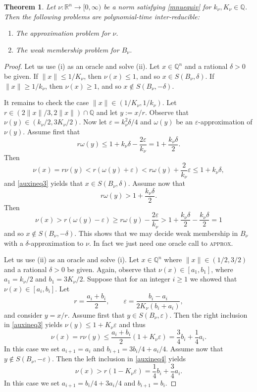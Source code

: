 \documentclass[11pt,reqno]{amsart}
\newtheorem{theorem}{Theorem}[section]
\theoremstyle{definition}
\theoremstyle{remark}
\begin{document}
\begin{theorem}\label{nuapproxwm}
Let  $\nu:\mathbb{R}^n \to [0,\infty)$ be a norm satisfying 
\eqref{mnuequiv} for $k_\nu, K_\nu \in \mathbb{Q}$. Then the following problems are polynomial-time inter-reducible:
\begin{enumerate}[\upshape (i)]
\item The approximation problem for $\nu$.
\item The weak membership problem for $B_\nu$.
\end{enumerate}

\end{theorem}
\begin{proof}  Let us use (i) as an oracle and solve (ii).  Let $x\in\mathbb{Q}^n$ and a rational $\delta>0$ be given.
If $\|x\|\le 1/K_\nu$, then $\nu(x)\le 1$, and so $x\in S(B_\nu,\delta)$.
If $\|x\|\ge 1/k_\nu$, then $\nu(x)\ge 1$, and so $x\notin S(B_\nu,-\delta)$. 

It remains to check the case $\|x\|\in (1/K_\nu, 1/k_\nu)$. Let $r\in (2\|x\|/3, 2\|x\|)\cap \mathbb{Q}$ and let $y:= x/ r$. Observe that $\nu(y)\in (k_\nu/2,3K_\nu/2)$. Now let  $\varepsilon=k_\nu^2\delta/4$ and $\omega(y)$ be an $\varepsilon$-approximation of $\nu(y)$. Assume first that 
\[
r\omega(y)\le 1+k_\nu\delta -\frac{2 \varepsilon}{k_\nu}=1+\frac{k_\nu\delta}{2}.
\]
Then
\[
\nu(x)= r\nu(y)< r(\omega(y)+\varepsilon)< r\omega(y)+\frac{2}{k_\nu}\varepsilon\le 1+k_\nu\delta,
\]
and \eqref{auxineq3} yields that $x\in S(B_\nu,\delta)$. Assume now that
\[
r\omega(y)> 1+\frac{k_\nu\delta}{2}.
\]
Then
\[
\nu(x)>r(\omega(y)-\varepsilon)\ge r\omega(y)-\frac{2\varepsilon}{k_\nu}>1+\frac{k_\nu\delta}{2}-\frac{k_\nu\delta}{2}=1
\]
and so $x\notin S(B_\nu,-\delta)$. This shows that we may decide weak membership in $B_\nu$ with a $\delta$-approximation to $\nu$. In fact we just need one oracle call to \textsc{approx}.

Let us use (ii) as an oracle and solve (i).   Let $x \in \mathbb{Q}^n$ where $\|x\|\in(1/2, 3/2)$ and a rational $\delta > 0$ be given. Again, observe that $\nu(x)\in [a_1,b_1]$, where $a_1= k_\nu/2$ and $b_1=3K_\nu/2$.  
Suppose that for an integer $i\ge 1$ we showed that $\nu(x)\in [a_i,b_i]$.
Let
\begin{equation}\label{defr}
r=\frac{a_i+b_i}{2},\qquad \varepsilon=\frac{b_i-a_i}{2K_\nu(b_i+a_i)},
\end{equation}
and consider $y=x/r$. Assume first that $y\in S(B_\nu,\varepsilon)$.  Then the right inclusion in \eqref{auxineq3} yields
$\nu(y)\le 1+K_\nu\varepsilon$ and thus
\[
\nu(x)=r\nu(y)\le \frac{a_i+b_i}{2}(1+K_\nu\varepsilon)= \frac{3}{4} b_i+\frac{1}{4}a_i.
\]
In this case we set $a_{i+1}=a_i$ and $b_{i+1}= 3b_i/4+ a_i/4$. Assume now that $y\notin S(B_\nu,-\varepsilon)$.  Then the left inclusion in \eqref{auxineq4} yields
\[
\nu(x)> r(1-K_\nu\varepsilon)= \frac{1}{4}b_i+\frac{3}{4}a_i.
\]
In this case we set  $a_{i+1}= b_i/4+3a_i/4$ and  $b_{i+1}=b_i$.


\end{proof}
\end{document}
